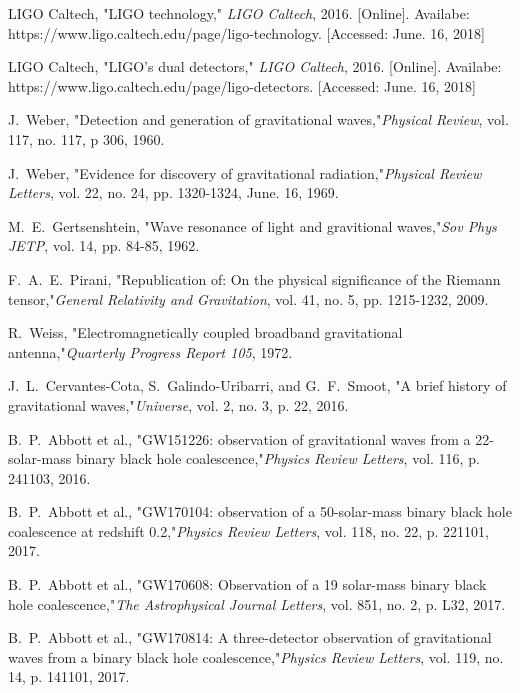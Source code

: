 \documentclass[journal,comsoc,twoside]{IEEEtran}
\begin{document}
\begin{thebibliography}{1}
LIGO Caltech, "LIGO technology," \emph{LIGO Caltech}, 2016. [Online]. Availabe: https://www.ligo.caltech.edu/page/ligo-technology. [Accessed: June. 16, 2018]

LIGO Caltech, "LIGO's dual detectors," \emph{LIGO Caltech}, 2016. [Online]. Availabe: https://www.ligo.caltech.edu/page/ligo-detectors. [Accessed: June. 16, 2018]

J.~Weber, "Detection and generation of gravitational waves,"\emph{Physical Review}, vol. 117, no. 117, p 306, 1960.

J.~Weber, "Evidence for discovery of gravitational radiation,"\emph{Physical Review Letters}, vol. 22, no. 24, pp. 1320-1324, June. 16, 1969.

M.~E.~Gertsenshtein, "Wave resonance of light and gravitional waves,"\emph{Sov Phys JETP}, vol. 14, pp. 84-85, 1962.

F.~A.~E.~Pirani, "Republication of: On the physical significance of the Riemann tensor,"\emph{General Relativity and Gravitation}, vol. 41, no. 5, pp. 1215-1232, 2009.

R.~Weiss, "Electromagnetically coupled broadband gravitational antenna,"\emph{Quarterly Progress Report 105}, 1972.

J.~L.~Cervantes-Cota, S.~Galindo-Uribarri, and G.~F.~Smoot, "A brief history of gravitational waves,"\emph{Universe}, vol. 2, no. 3, p. 22, 2016.

B.~P.~Abbott et al., "GW151226: observation of gravitational waves from a 22-solar-mass binary black hole coalescence,"\emph{Physics Review Letters}, vol. 116, p. 241103, 2016.

B.~P.~Abbott et al., "GW170104: observation of a 50-solar-mass binary black hole coalescence at redshift 0.2,"\emph{Physics Review Letters}, vol. 118, no. 22, p. 221101, 2017.

B.~P.~Abbott et al., "GW170608: Observation of a 19 solar-mass binary black hole coalescence,"\emph{The Astrophysical Journal Letters}, vol. 851, no. 2, p. L32, 2017.

B.~P.~Abbott et al., "GW170814: A three-detector observation of gravitational waves from a binary black hole coalescence,"\emph{Physics Review Letters}, vol. 119, no. 14, p. 141101, 2017.


\end{thebibliography}
\end{document}
